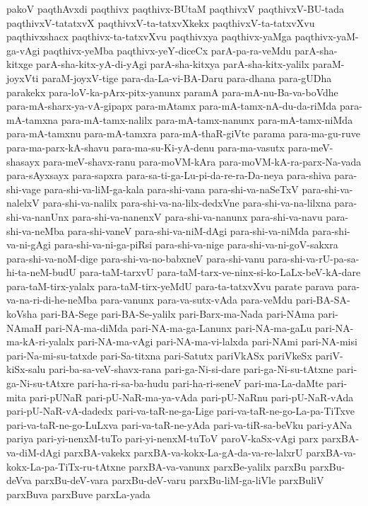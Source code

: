 {pakoV
paqthAvxdi
paqthivx
paqthivx-BUtaM
paqthivxV
paqthivxV-BU-tada
paqthivxV-tatatxvX
paqthivxV-ta-tatxvXkekx
paqthivxV-ta-tatxvXvu
paqthivxshacx
paqthivx-ta-tatxvXvu
paqthivxya
paqthivx-yaMga
paqthivx-yaM-ga-vAgi
paqthivx-yeMba
paqthivx-yeY-diceCx
parA-pa-ra-veMdu
parA-sha-kitxge
parA-sha-kitx-yA-di-yAgi
parA-sha-kitxya
parA-sha-kitx-yalilx
paraM-joyxVti
paraM-joyxV-tige
para-da-La-vi-BA-Daru
para-dhana
para-gUDha
parakekx
para-loV-ka-pArx-pitx-yanunx
paramA
para-mA-nu-Ba-va-boVdhe
para-mA-sharx-ya-vA-gipapx
para-mAtamx
para-mA-tamx-nA-du-da-riMda
para-mA-tamxna
para-mA-tamx-nalilx
para-mA-tamx-nanunx
para-mA-tamx-niMda
para-mA-tamxnu
para-mA-tamxra
para-mA-thaR-giVte
parama
para-ma-gu-ruve
para-ma-parx-kA-shavu
para-ma-su-Ki-yA-denu
para-ma-vasutx
para-meV-shasayx
para-meV-shavx-ranu
para-moVM-kAra
para-moVM-kA-ra-parx-Na-vada
para-sAyxsayx
para-sapxra
para-sa-ti-ga-Lu-pi-da-re-ra-Da-neya
para-shiva
para-shi-vage
para-shi-va-liM-ga-kala
para-shi-vana
para-shi-va-naSeTxV
para-shi-va-nalelxV
para-shi-va-nalilx
para-shi-va-na-lilx-dedxVne
para-shi-va-na-lilxna
para-shi-va-nanUnx
para-shi-va-nanenxV
para-shi-va-nanunx
para-shi-va-navu
para-shi-va-neMba
para-shi-vaneV
para-shi-va-niM-dAgi
para-shi-va-niMda
para-shi-va-ni-gAgi
para-shi-va-ni-ga-piRsi
para-shi-va-nige
para-shi-va-ni-goV-sakxra
para-shi-va-noM-dige
para-shi-va-no-babxneV
para-shi-vanu
para-shi-va-rU-pa-sa-hi-ta-neM-budU
para-taM-tarxvU
para-taM-tarx-ve-ninx-si-ko-LaLx-beV-kA-dare
para-taM-tirx-yalalx
para-taM-tirx-yeMdU
para-ta-tatxvXvu
parate
parava
para-va-na-ri-di-he-neMba
para-vanunx
para-va-sutx-vAda
para-veMdu
pari-BA-SA-koVsha
pari-BA-Sege
pari-BA-Se-yalilx
pari-Barx-ma-Nada
pari-NAma
pari-NAmaH
pari-NA-ma-diMda
pari-NA-ma-ga-Lanunx
pari-NA-ma-gaLu
pari-NA-ma-kA-ri-yalalx
pari-NA-ma-vAgi
pari-NA-ma-vi-lalxda
pari-NAmi
pari-NA-misi
pari-Na-mi-su-tatxde
pari-Sa-titxna
pari-Satutx
pariVkASx
pariVkeSx
pariV-kiSx-salu
pari-ba-sa-veV-shavx-rana
pari-ga-Ni-si-dare
pari-ga-Ni-su-tAtxne
pari-ga-Ni-su-tAtxre
pari-ha-ri-sa-ba-hudu
pari-ha-ri-seneV
pari-ma-La-daMte
pari-mita
pari-pUNaR
pari-pU-NaR-ma-ya-vAda
pari-pU-NaRnu
pari-pU-NaR-vAda
pari-pU-NaR-vA-dadedx
pari-va-taR-ne-ga-Lige
pari-va-taR-ne-go-La-pa-TiTxve
pari-va-taR-ne-go-LuLxva
pari-va-taR-ne-yAda
pari-va-tiR-sa-beVku
pari-yANa
pariya
pari-yi-nenxM-tuTo
pari-yi-nenxM-tuToV
paroV-kaSx-vAgi
parx
parxBA-va-diM-dAgi
parxBA-vakekx
parxBA-va-kokx-La-gA-da-va-re-lalxrU
parxBA-va-kokx-La-pa-TiTx-ru-tAtxne
parxBA-va-vanunx
parxBe-yalilx
parxBu
parxBu-deVva
parxBu-deV-vara
parxBu-deV-varu
parxBu-liM-ga-liVle
parxBuliV
parxBuva
parxBuve
parxLa-yada
}
